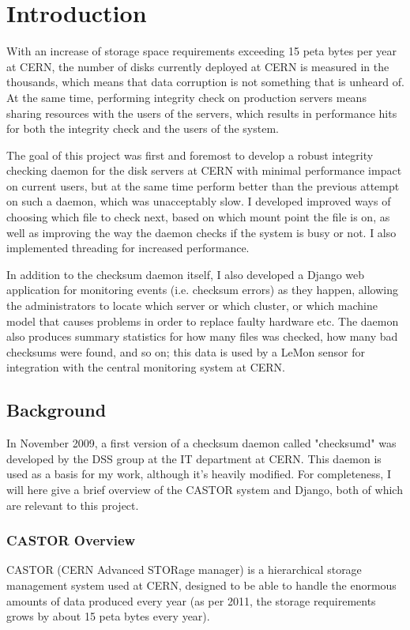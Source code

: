 \section{Introduction}
With an increase of storage space requirements exceeding 15 peta bytes per year at CERN, the number of disks currently deployed at CERN is measured in the thousands, which means that data corruption is not something that is unheard of. At the same time, performing integrity check on production servers means sharing resources with the users of the servers, which results in performance hits for both the integrity check and the users of the system. 

The goal of this project was first and foremost to develop a robust integrity checking daemon for the disk servers at CERN with minimal performance impact on current users, but at the same time perform better than the previous attempt on such a daemon, which was unacceptably slow. I developed improved ways of choosing which file to check next, based on which mount point the file is on, as well as improving the way the daemon checks if the system is busy or not. I also implemented threading for increased performance.

In addition to the checksum daemon itself, I also developed a Django web application for monitoring events (i.e. checksum errors) as they happen, allowing the administrators to locate which server or which cluster, or which machine model that causes problems in order to replace faulty hardware etc. The daemon also produces summary statistics for how many files was checked, how many bad checksums were found, and so on; this data is used by a LeMon sensor for integration with the central monitoring system at CERN.

\subsection{Background}
In November 2009, a first version of a checksum daemon called "checksumd" was developed by the DSS group at the IT department at CERN. This daemon is used as a basis for my work, although it's heavily modified. For completeness, I will here give a brief overview of the CASTOR system and Django, both of which are relevant to this project.

\subsubsection{CASTOR Overview}

CASTOR (CERN Advanced STORage manager) is a hierarchical storage management system used at CERN\cite{castor}, designed to be able to handle the enormous amounts of data produced every year (as per 2011, the storage requirements grows by about 15 peta bytes every year). 

